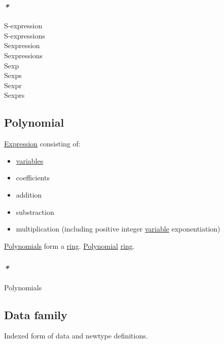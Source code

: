 \documentclass[11pt]{article}
\begin{document}
\subsubsection{\emph{*}}
\label{sec:org7824050}

\label{org6b9b6a0}S-expression\\
\label{org5ee2747}S-expressions\\
\label{orgb2e949c}Sexpression\\
\label{org1e8f626}Sexpressions\\
\label{org005744f}Sexp\\
\label{orga8a28e3}Sexps\\
\label{org656629c}Sexpr\\
\label{org04f2da5}Sexprs\\

\subsection{\label{orga488ca1}Polynomial}
\label{sec:org0763a0a}
\hyperref[org9021dd7]{Expression} consisting of:\\
\begin{itemize}
\item \hyperref[orge17f54f]{variables}\\
\item coefficients\\
\item addition\\
\item substraction\\
\item multiplication (including positive integer \hyperref[org0b57594]{variable} exponentiation)\\
\end{itemize}

\hyperref[orga3ce5ff]{Polynomials} form a \hyperref[orgce31c9f]{ring}. \hyperref[orga488ca1]{Polynomial} \hyperref[orgce31c9f]{ring}.\\

\subsubsection{\emph{*}}
\label{sec:org8fc0470}

\label{orga3ce5ff}Polynomials\\

\subsection{\label{orgd0e0a59}Data family}
\label{sec:org1620432}
Indexed form of data and newtype definitions.\\
\end{document}
